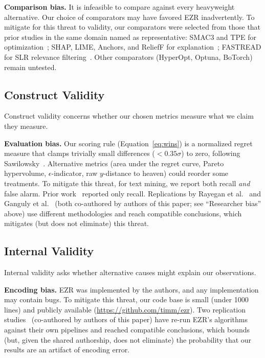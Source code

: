 \documentclass[AMA,STIX2COL]{WileyNJDv5}
\newcommand{\NEW}[1]{\textcolor{newblue}{#1}}
\newcommand{\IT}{{\sffamily EZR}}
\begin{document}
\textbf{Comparison bias.} It is infeasible to compare against every
heavyweight alternative. Our choice of comparators may have
favored \IT{} inadvertently.
To mitigate for this threat to validity,
our comparators were selected from those
that prior studies in the same domain named as
representative: SMAC3 and TPE for
optimization~\cite{hutter2011sequential,bergstra2011tpe};
SHAP, LIME, Anchors, and ReliefF for
explanation~\cite{lundberg2017unified,ribeiro2016should,
ribeiro2018anchors,robnik1997adaptation}; FASTREAD for SLR
relevance filtering~\cite{yu2018total}. Other comparators
(HyperOpt, Optuna, BoTorch) remain untested.

\subsection{Construct Validity}
Construct validity concerns whether our chosen metrics
measure what we claim they measure.

\textbf{Evaluation bias.} Our scoring rule (Equation~\ref{eq:wins})
is a normalized regret measure that clamps trivially small
differences \mbox{($<0.35\sigma$)} to zero, following
Sawilowsky~\cite{sawilowsky2009new}. Alternative metrics
(area under the regret curve, Pareto hypervolume,
$\epsilon$-indicator, raw $y$-distance to heaven) could
reorder some treatments.
To mitigate this threat, for text mining, we report both recall
{\em and} false alarm. Prior
work~\cite{yu2018total} reported only recall. Replications
by Rayegan et al.~\cite{Amiraliminimaldata}
and Ganguly et al.~\cite{ganguly2026lowgodatalightse}
(both co-authored by \NEW{authors of this paper}; see ``Researcher
bias'' above) use different methodologies and reach compatible
conclusions, which mitigates (but does not eliminate) this
threat.

\subsection{Internal Validity}
Internal validity asks whether alternative causes might
explain our observations.

\textbf{Encoding bias.} \IT{} was implemented by the authors, and
any implementation may contain bugs.
To mitigate this threat,
our code base is small \NEW{(under 1000 lines)} and
publicly available
(\url{https://github.com/timm/ezr}). Two replication
studies~\cite{Amiraliminimaldata,ganguly2026lowgodatalightse}
(co-authored by \NEW{authors of this paper}) have re-run \IT{}'s
algorithms against their own pipelines and reached compatible
conclusions, which bounds (but, given the shared authorship,
does not eliminate) the probability that our results are an
artifact of encoding error.
\end{document}
